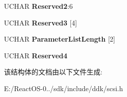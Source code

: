 \begin{DoxyCompactItemize}
U\+C\+H\+AR {\bfseries Reserved2}\+:6
\item 
\mbox{\label{struct___c_d_b_1_1___s_e_n_d___o_p_c___i_n_f_o_r_m_a_t_i_o_n_a7acb1cc8a265376f8615a65657eec4e1}} 
U\+C\+H\+AR {\bfseries Reserved3} \mbox{[}4\mbox{]}
\item 
\mbox{\label{struct___c_d_b_1_1___s_e_n_d___o_p_c___i_n_f_o_r_m_a_t_i_o_n_a630060873c6d1d96c160b674963c2ec6}} 
U\+C\+H\+AR {\bfseries Parameter\+List\+Length} \mbox{[}2\mbox{]}
\item 
\mbox{\label{struct___c_d_b_1_1___s_e_n_d___o_p_c___i_n_f_o_r_m_a_t_i_o_n_a43f0f98f8f18e259420936e9ba5d0e4d}} 
U\+C\+H\+AR {\bfseries Reserved4}
\end{DoxyCompactItemize}


该结构体的文档由以下文件生成\+:\begin{DoxyCompactItemize}
\item 
E\+:/\+React\+O\+S-\/0../sdk/include/ddk/scsi.\+h\end{DoxyCompactItemize}

